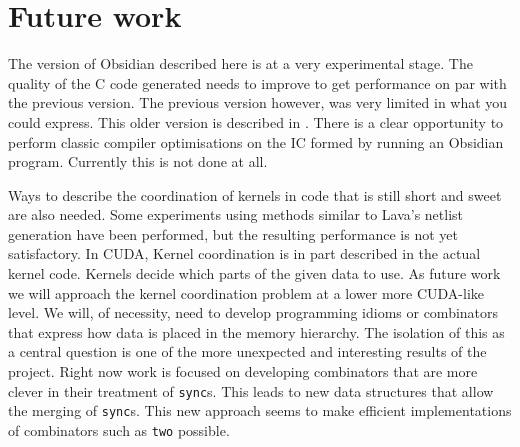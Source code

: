 \section{Future work} \label{sec:fut}

The version of Obsidian described here is at a very experimental stage. 
The quality of the C code generated needs to improve to get performance 
on par with the previous version. The previous version however, was very
limited in what you could express. This older version is described in
\cite{JMT}.
There is a clear opportunity to perform classic compiler optimisations on 
the IC formed by running an Obsidian program. Currently this is not done at all. 

Ways to describe the coordination 
of kernels in code that is still short and sweet are also needed. Some experiments using 
methods similar to Lava's netlist generation have been performed, but the
resulting performance is not yet satisfactory. In CUDA, Kernel coordination 
is in part described in the actual kernel code. Kernels decide which parts 
of the given data to use. As future work we will approach the kernel 
coordination problem at a lower more CUDA-like level. We will, of necessity,
need to develop programming idioms or combinators that express how data is 
placed in the memory hierarchy. The isolation of this as a central question 
is one of the more unexpected and interesting results of the project.
Right now work is focused on developing combinators that are more clever 
in their treatment of {\tt sync}s. This leads to new data structures that 
allow the merging of {\tt sync}s. This new approach seems to make efficient
implementations of combinators such as {\tt two} possible. 



